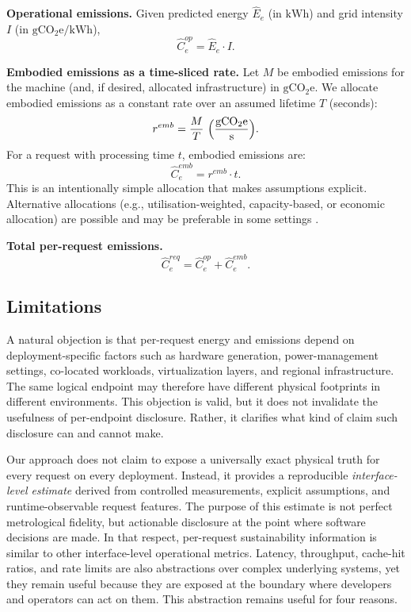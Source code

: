 \textbf{Operational emissions.}
Given predicted energy \(\widehat{E}_e\) (in \(\mathrm{kWh}\)) and grid intensity \(I\) (in \(\mathrm{gCO_2e/kWh}\)),
\[
\widehat{C}^{op}_e = \widehat{E}_e \cdot I.
\]

\textbf{Embodied emissions as a time-sliced rate.}
Let \(M\) be embodied emissions for the machine (and, if desired, allocated infrastructure) in \(\mathrm{gCO_2e}\). We allocate embodied emissions as a constant rate over an assumed lifetime \(T\) (seconds):
\[
r^{emb} = \frac{M}{T}\ \mathrm{\Bigl(\frac{gCO_2e}{s}\Bigr)}.
\]
For a request with processing time \(t\), embodied emissions are:
\[
\widehat{C}^{emb}_e = r^{emb} \cdot t.
\]
This is an intentionally simple allocation that makes assumptions explicit. Alternative allocations (e.g., utilisation-weighted, capacity-based, or economic allocation) are possible and may be preferable in some settings \cite{iso14040,iso14044,ghgproduct,gsf-sci}.

\textbf{Total per-request emissions.}
\[
\widehat{C}^{req}_e = \widehat{C}^{op}_e + \widehat{C}^{emb}_e.
\]

 \subsection{Limitations}
\label{subsec:limitations}
A natural objection is that per-request energy and emissions depend on deployment-specific factors such as hardware generation, power-management settings, co-located workloads, virtualization layers, and regional infrastructure. The same logical endpoint may therefore have different physical footprints in different environments. This objection is valid, but it does not invalidate the usefulness of per-endpoint disclosure. Rather, it clarifies what kind of claim such disclosure can and cannot make.

Our approach does not claim to expose a universally exact physical truth for every request on every deployment. Instead, it provides a reproducible \emph{interface-level estimate} derived from controlled measurements, explicit assumptions, and runtime-observable request features. The purpose of this estimate is not perfect metrological fidelity, but actionable disclosure at the point where software decisions are made. In that respect, per-request sustainability information is similar to other interface-level operational metrics. Latency, throughput, cache-hit ratios, and rate limits are also abstractions over complex underlying systems, yet they remain useful because they are exposed at the boundary where developers and operators can act on them. This abstraction remains useful for four reasons.

